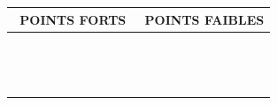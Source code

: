 \newpage

\begin{table}[h!]
\centering
\begin{tabular}{p{0.5\linewidth}|p{0.5\linewidth}} 
\hline
\multicolumn{1}{c|}{\textbf{POINTS FORTS}} & \multicolumn{1}{c}{\textbf{POINTS FAIBLES}} \\ 
\hline
& \\ %
& \\ %
& \\ %
& \\ %
& \\ %
& \\ %
& \\ %
& \\ %
& \\ %
& \\ %
& \\ %
& \\ %
& \\ %
& \\ %
\hline
\end{tabular}
\end{table}